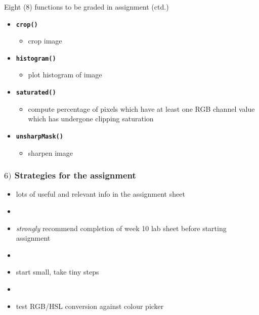 \documentclass[english,14pt]{beamer}
\newcommand\red[1]{{\color{red} #1}}
\begin{document}
\begin{frame}[fragile]

\frametitle{}

Eight (8) functions to be graded in assignment (ctd.)

\vspace*{5mm}

\begin{itemize}
	\item \textbf{\red{\texttt{crop()}}}
	\begin{itemize}
		\item crop image
	\end{itemize}
		
	\item \textbf{\red{\texttt{histogram()}}}
	\begin{itemize}
		\item plot histogram of image
	\end{itemize}
			
	\item \textbf{\red{\texttt{saturated()}}}
	\begin{itemize}
		\item compute percentage of pixels which have at least one RGB channel value which has undergone clipping saturation
	\end{itemize}
			
	\item \textbf{\red{\texttt{unsharpMask()}}}
	\begin{itemize}
		\item sharpen image
	\end{itemize}
\end{itemize}

\end{frame}


\begin{frame}[fragile]

\frametitle{$6)$ Strategies for the assignment}

\begin{itemize}
	\item lots of useful and relevant info in the assignment sheet
	\item[]
	\item \emph{strongly} recommend completion of week 10 lab sheet before starting assignment
	\item[]
	\item start small, take tiny steps
	\item[]
	\item test RGB/HSL conversion against colour picker
\end{itemize}

\end{frame}
\end{document}
